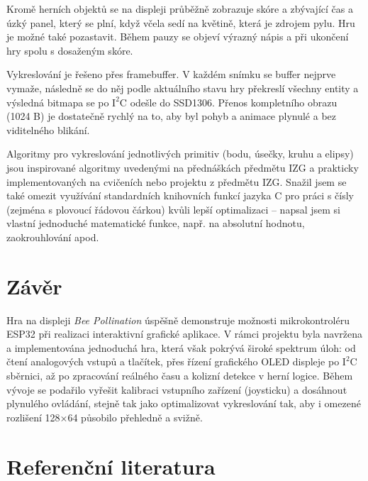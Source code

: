 \documentclass[11pt,a4paper]{article}
\begin{document}
Kromě herních objektů se na displeji průběžně zobrazuje skóre a zbývající čas a úzký panel, který se plní, když včela sedí na květině, která je zdrojem pylu. Hru je možné také pozastavit. 
Během pauzy se objeví výrazný nápis  a při ukončení hry  spolu s dosaženým skóre.

Vykreslování je řešeno přes framebuffer. V každém snímku se buffer nejprve vymaže, následně se do něj podle aktuálního stavu hry překreslí všechny entity a výsledná bitmapa se po 
$\text{I}^2\text{C}$ odešle do SSD1306. Přenos kompletního obrazu (1024 B) je dostatečně rychlý na to, aby byl pohyb a animace plynulé a bez viditelného blikání.

Algoritmy pro vykreslování jednotlivých primitiv (bodu, úsečky, kruhu a elipsy) jsou inspirované algoritmy uvedenými na přednáškách předmětu IZG a prakticky implementovaných na cvičeních 
nebo projektu z předmětu IZG. Snažil jsem se také omezit využívání standardních knihovních funkcí jazyka C pro práci s čísly (zejména s plovoucí řádovou čárkou) kvůli lepší optimalizaci -- napsal jsem si vlastní jednoduché matematické funkce, např. na absolutní hodnotu, zaokrouhlování apod. 

\section{Závěr}

Hra na displeji \emph{Bee Pollination} úspěšně demonstruje možnosti mikrokontroléru ESP32 při realizaci interaktivní grafické aplikace. V rámci projektu byla navržena a implementována jednoduchá hra, která však pokrývá široké spektrum úloh: od čtení analogových vstupů a  tlačítek, přes řízení grafického OLED displeje po $\text{I}^2\text{C}$ sběrnici, až po zpracování reálného času a kolizní detekce v herní logice. Během vývoje se podařilo vyřešit kalibraci vstupního zařízení (joysticku) a dosáhnout plynulého ovládání, stejně tak jako optimalizovat vykreslování tak, aby i omezené rozlišení 128×64 působilo přehledně a svižně. 




\renewcommand{\refname}{}
\section{Referenční literatura}
\vspace{-1.1cm}

\end{document}
